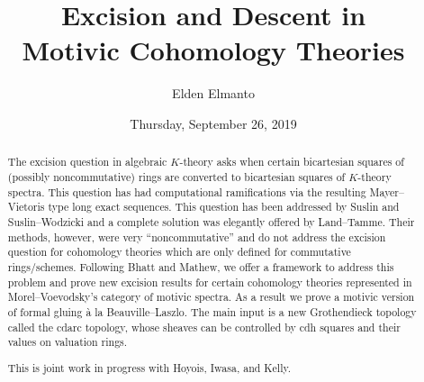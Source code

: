 \documentclass{UAmathtalk}
\author{Elden Elmanto}
\title{Excision and Descent in\\ Motivic Cohomology Theories}
\date{Thursday, September 26, 2019}
\begin{document}
\maketitle

\begin{abstract}
The excision question in algebraic $K$-theory asks when certain bicartesian squares of (possibly noncommutative) rings are converted to bicartesian squares of $K$-theory spectra. This question has had computational ramifications via the resulting Mayer--Vietoris type long exact sequences. This question has been addressed by Suslin and Suslin--Wodzicki and a complete solution was elegantly offered by Land--Tamme. Their methods, however, were very ``noncommutative'' and do not address the excision question for cohomology theories which are only defined for commutative rings/schemes. Following Bhatt and Mathew, we offer a framework to address this problem and prove new excision results for certain cohomology theories represented in Morel--Voevodsky's category of motivic spectra. As a result we prove a motivic version of formal gluing à la Beauville--Laszlo. The main input is a new Grothendieck topology called the cdarc topology, whose sheaves can be controlled by cdh squares and their values on valuation rings.

This is joint work in progress with Hoyois, Iwasa, and Kelly.
\end{abstract}
\end{document}
